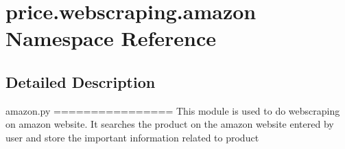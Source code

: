 \hypertarget{namespaceprice_1_1webscraping_1_1amazon}{}\section{price.\+webscraping.\+amazon Namespace Reference}
\label{namespaceprice_1_1webscraping_1_1amazon}


\subsection{Detailed Description}
\begin{DoxyVerb}amazon.py
================
This module is used to do webscraping on amazon website. It searches the product on the amazon website entered by user and store the important information related to product
\end{DoxyVerb}
 